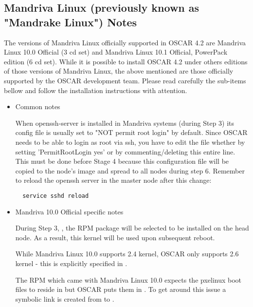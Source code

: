 \subsection{Mandriva Linux (previously known as "Mandrake Linux") Notes}
\label{subsec:mdk10notes}

The versions of Mandriva Linux officially supported in OSCAR 4.2 are
Mandriva Linux 10.0 Official (3 cd set) and Mandriva Linux 10.1 Official, 
PowerPack edition (6 cd set). While it is possible to install OSCAR 4.2 under 
others editions of those versions of Mandriva Linux, the above mentioned are
those officially supported by the OSCAR development team. Please read 
carefully the sub-items bellow and follow the installation instructions
with attention. 

\begin{itemize}

\item Common notes

When openssh-server is installed in Mandriva systems (during Step 3)
its config file is usually set to "NOT permit root login" by default.
Since OSCAR needs to be able to login as root via ssh, you have to edit the
file  whether by setting 
'PermitRootLogin yes' or by commenting/deleting this entire line. This must 
be done before Stage 4 because this configuration file will be copied to the 
node's image and spread to all nodes during step 6. Remember to reload
the openssh server in the master node after this change:
\begin{verbatim}
  service sshd reload
\end{verbatim}

\item Mandriva 10.0 Official specific notes

During Step 3, , the RPM package
 will be selected to be installed on the head node.
As a result, this kernel will be used upon subsequent reboot.

While Mandriva Linux 10.0 supports 2.4 kernel, OSCAR only supports
2.6 kernel - this is explicitly specified in
.

The  RPM which came with Mandriva Linux 10.0 expects the
pxelinux boot files to reside in  but OSCAR puts
them in .  To get around this issue a symbolic link is
created from  to .



\end{itemize}
